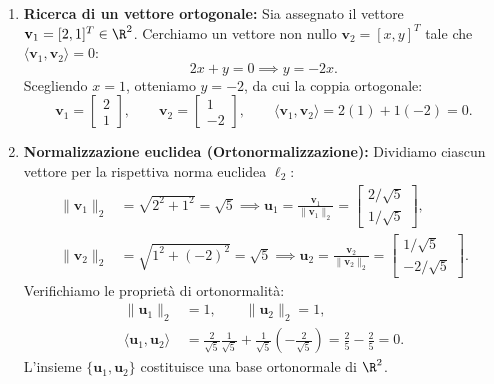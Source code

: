 \begin{example}
\mbox{}\par\nopagebreak
\begin{enumerate}
    \item \textbf{Ricerca di un vettore ortogonale:}
    Sia assegnato il vettore $\mathbf{v}_1 = [2, 1]^T \in \R^2$. Cerchiamo un vettore non nullo $\mathbf{v}_2 = [x, y]^T$ tale che $\langle \mathbf{v}_1, \mathbf{v}_2 \rangle = 0$:
    \begin{equation}
        2x + y = 0 \implies y = -2x.
    \end{equation}
    Scegliendo $x = 1$, otteniamo $y = -2$, da cui la coppia ortogonale:
    \begin{equation}
        \mathbf{v}_1 = \begin{bmatrix} 2 \\ 1 \end{bmatrix}, \qquad \mathbf{v}_2 = \begin{bmatrix} 1 \\ -2 \end{bmatrix}, \qquad \langle \mathbf{v}_1, \mathbf{v}_2 \rangle = 2(1) + 1(-2) = 0.
    \end{equation}
    \item \textbf{Normalizzazione euclidea (Ortonormalizzazione):}
    Dividiamo ciascun vettore per la rispettiva norma euclidea $\ell_2$:
    \begin{align}
        \|\mathbf{v}_1\|_2 &= \sqrt{2^2 + 1^2} = \sqrt{5} \implies \mathbf{u}_1 = \frac{\mathbf{v}_1}{\|\mathbf{v}_1\|_2} = \begin{bmatrix} 2/\sqrt{5} \\ 1/\sqrt{5} \end{bmatrix}, \\
        \|\mathbf{v}_2\|_2 &= \sqrt{1^2 + (-2)^2} = \sqrt{5} \implies \mathbf{u}_2 = \frac{\mathbf{v}_2}{\|\mathbf{v}_2\|_2} = \begin{bmatrix} 1/\sqrt{5} \\ -2/\sqrt{5} \end{bmatrix}.
    \end{align}
    Verifichiamo le propriet\`a di ortonormalit\`a:
    \begin{align}
        \|\mathbf{u}_1\|_2 &= 1, \qquad \|\mathbf{u}_2\|_2 = 1, \\
        \langle \mathbf{u}_1, \mathbf{u}_2 \rangle &= \frac{2}{\sqrt{5}}\frac{1}{\sqrt{5}} + \frac{1}{\sqrt{5}}\left(-\frac{2}{\sqrt{5}}\right) = \frac{2}{5} - \frac{2}{5} = 0.
    \end{align}
    L'insieme $\{\mathbf{u}_1, \mathbf{u}_2\}$ costituisce una base ortonormale di $\R^2$.
\end{enumerate}
\end{example}

